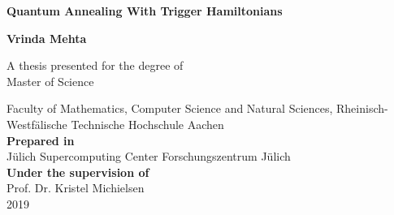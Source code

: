 \begin{titlepage}
    \begin{center}
        \vspace*{1cm}
 
        \Large
        \textbf{Quantum Annealing With Trigger Hamiltonians}
 
        \vspace{0.5cm}
 
        \vspace{1.5cm}
 
        \textbf{Vrinda Mehta}
 
        \vfill
 
        A thesis presented for the degree of\\
        Master of Science
 
        \vspace{0.8cm}
 
        Faculty of Mathematics, Computer Science and Natural Sciences, Rheinisch-Westfälische Technische Hochschule Aachen\\
        \textbf{Prepared in}\\
        J{\"u}lich Supercomputing Center
        Forschungszentrum J{\"u}lich\\
        \textbf{Under the supervision of}\\
        Prof. Dr. Kristel Michielsen\\
        2019
 
    \end{center}
\end{titlepage}